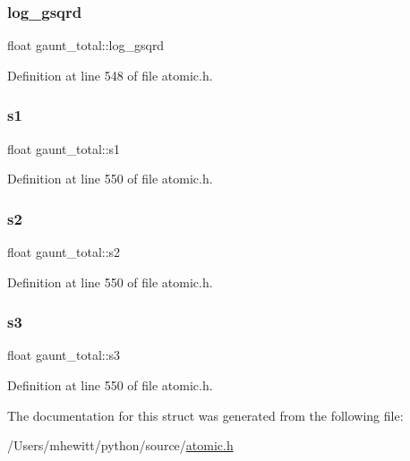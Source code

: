 \mbox{\label{structgaunt__total_afab87d92003ffff52de20562aa3a5ecc}} 
\subsubsection{\texorpdfstring{log\+\_\+gsqrd}{log\_gsqrd}}
{\footnotesize\ttfamily float gaunt\+\_\+total\+::log\+\_\+gsqrd}



Definition at line 548 of file atomic.\+h.

\mbox{\label{structgaunt__total_a4274528ef519b394457a079752e7eacf}} 
\subsubsection{\texorpdfstring{s1}{s1}}
{\footnotesize\ttfamily float gaunt\+\_\+total\+::s1}



Definition at line 550 of file atomic.\+h.

\mbox{\label{structgaunt__total_aeb82d15d5958653015fb73bbde7f4a5d}} 
\subsubsection{\texorpdfstring{s2}{s2}}
{\footnotesize\ttfamily float gaunt\+\_\+total\+::s2}



Definition at line 550 of file atomic.\+h.

\mbox{\label{structgaunt__total_acfc24e1b011a5c27e689f0b285e39ff1}} 
\subsubsection{\texorpdfstring{s3}{s3}}
{\footnotesize\ttfamily float gaunt\+\_\+total\+::s3}



Definition at line 550 of file atomic.\+h.



The documentation for this struct was generated from the following file\+:\begin{DoxyCompactItemize}
\item 
/\+Users/mhewitt/python/source/\hyperlink{atomic_8h}{atomic.\+h}\end{DoxyCompactItemize}
